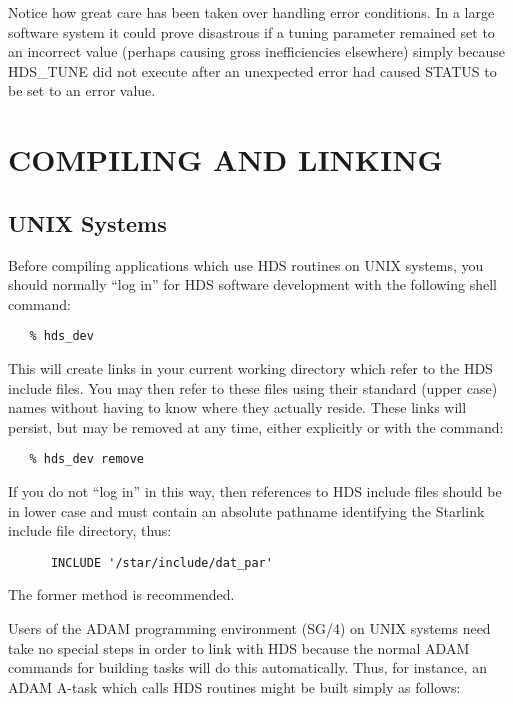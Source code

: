 Notice how great care has been taken over handling error conditions. In a large
software system it could prove disastrous if a tuning parameter remained set to
an incorrect value (perhaps causing gross inefficiencies elsewhere) simply
because HDS\_TUNE did not execute after an unexpected error had caused STATUS to
be set to an error value.

\section{COMPILING AND LINKING}

\subsection{UNIX Systems}

Before compiling applications which use HDS routines on UNIX systems, you should
normally ``log in'' for HDS software development with the following shell
command:

\small
\begin{verbatim}
   % hds_dev
\end{verbatim}
\normalsize

This will create links in your current working directory which refer to the HDS
include files. You may then refer to these files using their standard (upper
case) names without having to know where they actually reside. These links will
persist, but may be removed at any time, either explicitly or with the command:

\small
\begin{verbatim}
   % hds_dev remove
\end{verbatim}
\normalsize

If you do not ``log in'' in this way, then references to HDS include files
should be in lower case and must contain an absolute pathname identifying the
Starlink include file directory, thus:

\small
\begin{verbatim}
      INCLUDE '/star/include/dat_par'
\end{verbatim}
\normalsize

The former method is recommended.

Users of the ADAM programming environment (SG/4) on UNIX systems need take no
special steps in order to link with HDS because the normal ADAM commands for
building tasks will do this automatically. Thus, for instance, an ADAM A-task
which calls HDS routines might be built simply as follows:

